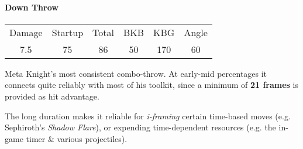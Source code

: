 \paragraph{Down Throw}
\begin{center}
	\begin{tabular}{| c | c c | c c | c |}
		\hline
		Damage	&	Startup	&	Total	&	BKB	&	KBG	&	Angle	\\
		7.5		&	75		&	86		&	50	&	170	&	60\deg	\\		\hline
	\end{tabular}
\end{center}
Meta Knight's most consistent combo-throw. At early-mid percentages it connects quite reliably with most of his toolkit, since a minimum of \textbf{21 frames} is provided as hit advantage.

The long duration makes it reliable for \textit{i-framing} certain time-based moves (e.g. Sephiroth's \textit{Shadow Flare}), or expending time-dependent resources (e.g. the in-game timer \& various projectiles).